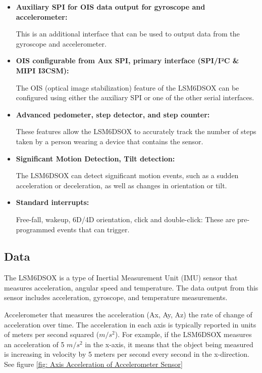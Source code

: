 \begin{itemize}
	
	\item  \textbf{Auxiliary SPI for OIS data output for gyroscope and accelerometer: }
	
	This is an additional interface that can be used to output data from the gyroscope and accelerometer.
	
	\item  \textbf{OIS configurable from Aux SPI, primary interface (SPI/I²C \& MIPI I3CSM): }
	
	The OIS (optical image stabilization) feature of the LSM6DSOX can be configured using either the auxiliary SPI or one of the other serial interfaces.
	
	\item  \textbf{Advanced pedometer, step detector, and step counter: }
	
	These features allow the LSM6DSOX to accurately track the number of steps taken by a person wearing a device that contains the sensor.
	
	\item  \textbf{Significant Motion Detection, Tilt detection: }
	
	The LSM6DSOX can detect significant motion events, such as a sudden acceleration or deceleration, as well as changes in orientation or tilt.
	
	\item  \textbf{Standard interrupts:}
	
	Free-fall, wakeup, 6D/4D orientation, click and double-click: These are pre-programmed events that can trigger.
	
\end{itemize}


\subsection{Data}

The LSM6DSOX is a type of Inertial Measurement Unit (IMU) sensor that measures acceleration, angular speed and temperature. The data output from this sensor includes acceleration, gyroscope, and temperature measurements.

\bigskip

Accelerometer that measures the acceleration (Ax, Ay, Az) the rate of change of acceleration over time. The acceleration in each axis is typically reported in units of meters per second squared ($m/s^2$). For example, if the LSM6DSOX measures an acceleration of 5 $m/s^2$ in the x-axis, it means that the object being measured is increasing in velocity by 5 meters per second every second in the x-direction. See figure \ref{fig: Axis Acceleration of Accelerometer Sensor}


